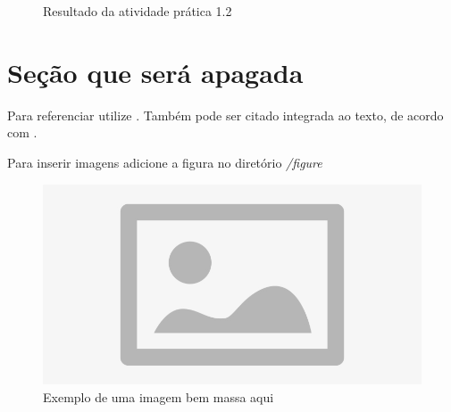 \begin{figure}[H] %
  \center
  \caption{Resultado da atividade prática 1.2}\label{fig:ap1_cod_vigual1}
\end{figure}

\section{Seção que será apagada}

Para referenciar utilize \cite{ninguem2022curioso}. Também pode ser citado integrada ao texto, de acordo com .

Para inserir imagens adicione a figura no diretório \textit{/figure}

\begin{figure}[H]
\centering
\includegraphics[width=1\textwidth]{figure/placeholder.jpg}
\caption{Exemplo de uma imagem bem massa aqui}
\label{fig:imagem_massa}
\end{figure}

